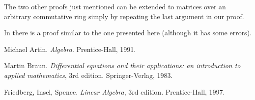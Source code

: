 \documentclass[12pt]{article}
\begin{document}
The two other proofs just mentioned can be extended to matrices
over an arbitrary commutative ring simply by repeating the last argument
in our proof.

In \cite{Braun} there is a proof similar to the one presented here (although it has some errors).

\begin{thebibliography}{XXXXXX}

Michael Artin. {\it Algebra}. Prentice-Hall, 1991.

Martin Braun. {\it Differential equations and their applications: an introduction to applied mathematics},
3rd edition.  Springer-Verlag, 1983.

Friedberg, Insel, Spence. 
{\it Linear Algebra}, 3rd edition. Prentice-Hall, 1997.

\end{thebibliography}
\end{document}
